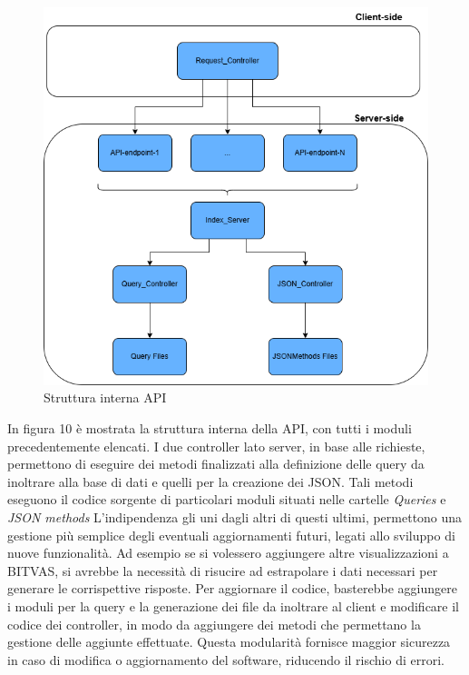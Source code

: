 \newpage
\thispagestyle{mystyle}
\begin{figure}[H]
    \centering \includegraphics[keepaspectratio=true,scale=0.55]{Images/StrutturaInternaAPI.png}
    \caption{Struttura interna API}
\end{figure}

In figura 10 è mostrata la struttura interna della API, con tutti i moduli precedentemente elencati.
I due controller lato server, in base alle richieste, permettono di eseguire dei metodi finalizzati alla definizione delle query da inoltrare alla base di dati e quelli per la creazione dei JSON.
Tali metodi eseguono il codice sorgente di particolari moduli situati nelle cartelle \emph{Queries} e \emph{JSON methods}
L'indipendenza gli uni dagli altri di questi ultimi, permettono una gestione più semplice degli eventuali aggiornamenti futuri, legati allo sviluppo di nuove funzionalità.
Ad esempio se si volessero aggiungere altre visualizzazioni a BITVAS, si avrebbe la necessità di risucire ad estrapolare i dati necessari per generare le corrispettive risposte.
Per aggiornare il codice, basterebbe aggiungere i moduli per la query e la generazione dei file da inoltrare al client e modificare il codice dei controller, in modo da aggiungere dei metodi che permettano la gestione delle aggiunte effettuate.
Questa modularità fornisce maggior sicurezza in caso di modifica o aggiornamento del software, riducendo il rischio di errori.

